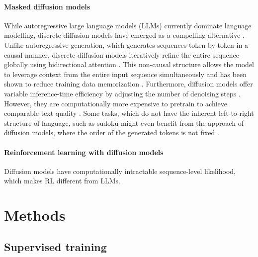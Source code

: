 \documentclass[letterpaper]{article} %
\begin{document}
\paragraph{Masked diffusion models}

While autoregressive large language models (LLMs) currently dominate language modelling, discrete diffusion models have emerged as a compelling alternative \cite{nie2025largelanguagediffusionmodels,ye2025dream7bdiffusionlarge}. Unlike autoregressive generation, which generates sequences token-by-token in a causal manner, discrete diffusion models iteratively refine the entire sequence globally using bidirectional attention \cite{austin2021structureddenoisingdiffusionmodels}. This non-causal structure allows the model to leverage context from the entire input sequence simultaneously and has been shown to reduce training data memorization \cite{luo2026characterizingmemorizationdiffusionlanguage}. Furthermore, diffusion models offer variable inference-time efficiency by adjusting the number of denoising steps \cite{austin2021structureddenoisingdiffusionmodels}. However, they are computationally more expensive to pretrain to achieve comparable text quality \cite{nie2025scalingmaskeddiffusionmodels}. Some tasks, which do not have the inherent left-to-right structure of language, such as sudoku might even benefit from the approach of diffusion models, where the order of the generated tokens is not fixed \cite{Ye2025beyondautoregression}.


\paragraph{Reinforcement learning with diffusion models}


Diffusion models have computationally intractable sequence-level likelihood, which makes RL different from LLMs.

\cite{ou2025principledrldiffusionllms,zhao2025d1scalingreasoningdiffusion,wang2026d2improvingresoning,rojas2025improvingreasoningdiffusionlanguage,black2024trainingdiffusionmodelsreinforcement,fan2023dpok,SuttonAndBarto2018}



\section{Methods}
\label{sec:methods}


\subsection{Supervised training}
\end{document}
